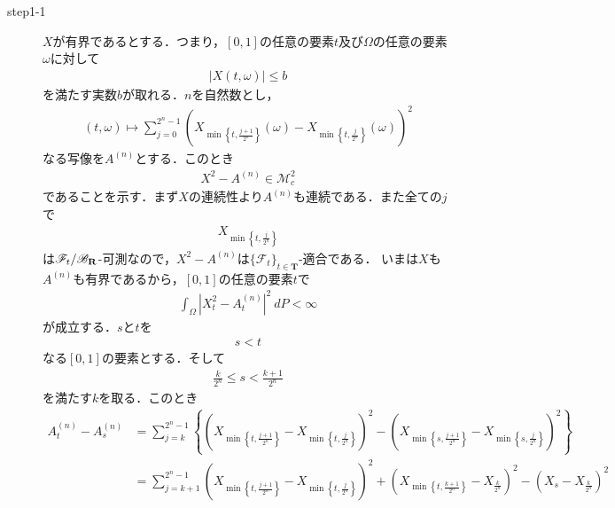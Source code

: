 	\begin{sketch}\mbox{}
		\begin{description}
			\item[step1-1] $X$が有界であるとする．つまり，$[0,1]$の任意の要素$t$及び$\Omega$の任意の要素$\omega$に対して
				\begin{align}
					|X(t,\omega)| \leq b
				\end{align}
				を満たす実数$b$が取れる．$n$を自然数とし，
				\begin{align}
					(t,\omega) \longmapsto \sum_{j=0}^{2^n-1} \left(X_{\min\left\{t,\frac{j+1}{2^n}\right\}}(\omega)
					- X_{\min\left\{t,\frac{j}{2^n}\right\}}(\omega)\right)^2
				\end{align}
				なる写像を$A^{(n)}$とする．このとき
				\begin{align}
					X^2 - A^{(n)} \in \mathscr{M}_{c}^{2}
					\label{fom:thm_decomposition_of_square_integrable_martingales_2}
				\end{align}
				であることを示す．まず$X$の連続性より$A^{(n)}$も連続である．また全ての$j$で
				\begin{align}
					X_{\min\left\{t,\frac{j}{2^n}\right\}}
				\end{align}
				は$\mathscr{F}_t/\mathscr{B}_{\mathbf{R}}$-可測なので，$X^2-A^{(n)}$は$\{\mathscr{F}_t\}_{t \in \mathbf{T}}$-適合である．
				いまは$X$も$A^{(n)}$も有界であるから，$[0,1]$の任意の要素$t$で
				\begin{align}
					\int_{\Omega} \left|X_t^2-A_t^{(n)}\right|^2\ dP < \infty
				\end{align}
				が成立する．$s$と$t$を
				\begin{align}
					s < t
				\end{align}
				なる$[0,1]$の要素とする．そして
				\begin{align}
					\frac{k}{2^n} \leq s < \frac{k+1}{2^n}
				\end{align}
				を満たす$k$を取る．このとき
				\begin{align}
					A^{(n)}_t - A^{(n)}_s
					&= \sum_{j=k}^{2^n-1} \left\{
					\left(X_{\min\left\{t,\frac{j+1}{2^n}\right\}} - X_{\min\left\{t,\frac{j}{2^n}\right\}}\right)^2
					- \left(X_{\min\left\{s,\frac{j+1}{2^n}\right\}} - X_{\min\left\{s,\frac{j}{2^n}\right\}}\right)^2\right\} \\
					&= \sum_{j=k+1}^{2^n-1} \left(X_{\min\left\{t,\frac{j+1}{2^n}\right\}} - X_{\min\left\{t,\frac{j}{2^n}\right\}}\right)^2
					+ \left(X_{\min\left\{t,\frac{k+1}{2^n}\right\}} - X_{\frac{k}{2^n}}\right)^2
					- \left(X_s - X_{\frac{k}{2^n}}\right)^2

\end{align}
\end{description}
\end{sketch}
